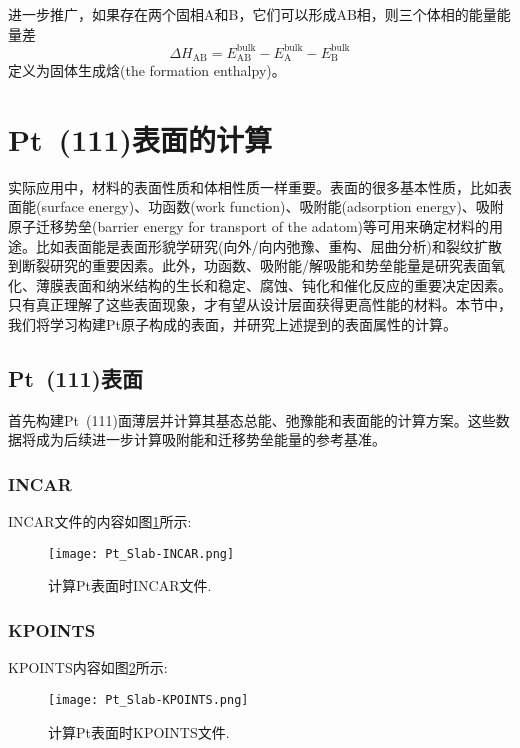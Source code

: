 进一步推广，如果存在两个固相\textrm{A}和{B}，它们可以形成\textrm{AB}相，则三个体相的能量能量差
\begin{displaymath}
	\Delta H_{\mathrm{AB}}=E_{\mathrm{AB}}^{\mathrm{bulk}}-E_{\mathrm{A}}^{\mathrm{bulk}}-E_{\mathrm{B}}^{\mathrm{bulk}}
\end{displaymath}
定义为固体生成焓\textrm{(the formation enthalpy)}。
\section{\rm{Pt~(111)}表面的计算}\label{Sec:Surface-Pt}
实际应用中，材料的表面性质和体相性质一样重要。表面的很多基本性质，比如表面能\textrm{(surface energy)}、功函数\textrm{(work function)}、吸附能\textrm{(adsorption energy)}、吸附原子迁移势垒\textrm{(barrier energy for transport of the adatom)}等可用来确定材料的用途。比如表面能是表面形貌学研究(向外/向内弛豫、重构、屈曲分析)和裂纹扩散到断裂研究的重要因素。此外，功函数、吸附能/解吸能和势垒能量是研究表面氧化、薄膜表面和纳米结构的生长和稳定、腐蚀、钝化和催化反应的重要决定因素。只有真正理解了这些表面现象，才有望从设计层面获得更高性能的材料。本节中，我们将学习构建\textrm{Pt}原子构成的表面，并研究上述提到的表面属性的计算。
\subsection{\rm{Pt~(111)}表面}
首先构建\textrm{Pt~(111)}面薄层并计算其基态总能、弛豫能和表面能的计算方案。这些数据将成为后续进一步计算吸附能和迁移势垒能量的参考基准。
\subsubsection{\rm{INCAR}}
\textrm{INCAR}文件的内容如图\ref{Pt_Slab-INCAR}所示:~
\begin{figure}[h!]
\centering
\vskip -5pt
\texttt{[image: Pt\_Slab-INCAR.png]}
\caption{\small \textrm{计算\textrm{Pt}表面时\textrm{INCAR}文件.}}%
\label{Pt_Slab-INCAR}
\end{figure}
\subsubsection{\rm{KPOINTS}}
\textrm{KPOINTS}内容如图\ref{Pt_Slab-KPOINTS}所示:~
\begin{figure}[h!]
\centering
\vskip -5pt
\texttt{[image: Pt\_Slab-KPOINTS.png]}
\caption{\small \textrm{计算\textrm{Pt}表面时\textrm{KPOINTS}文件.}}%
\label{Pt_Slab-KPOINTS}
\end{figure}
